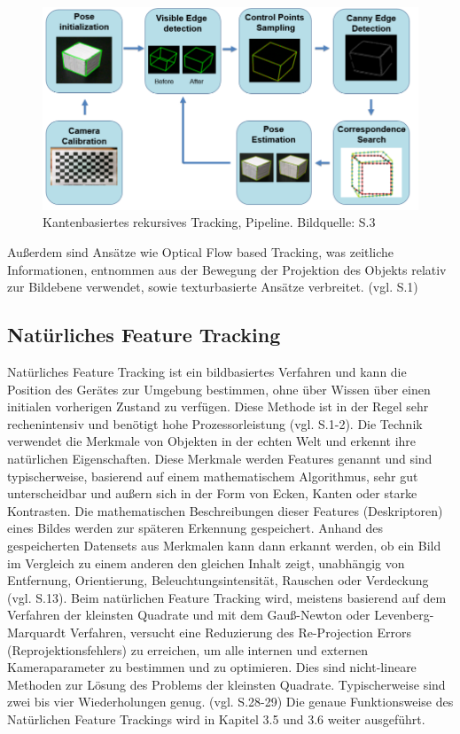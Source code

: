 \begin{figure}[H]
	\centering
	\includegraphics[scale=0.75]{wire.png}
	\caption{Kantenbasiertes rekursives Tracking, Pipeline. Bildquelle: \cite{model_based} S.3}
\end{figure} 

Außerdem sind Ansätze wie \glqq Optical Flow based Tracking\grqq{}, was zeitliche Informationen, entnommen aus der Bewegung der Projektion des Objekts relativ zur Bildebene verwendet, sowie texturbasierte Ansätze verbreitet. (vgl. \cite{model_based} S.1)

\subsection{Natürliches Feature Tracking}

Natürliches Feature Tracking ist ein bildbasiertes Verfahren und kann die Position des Gerätes zur Umgebung bestimmen, ohne über Wissen über einen initialen vorherigen Zustand zu verfügen. Diese Methode ist in der Regel sehr rechenintensiv und benötigt hohe Prozessorleistung (vgl. \cite{model_based} S.1-2). Die Technik verwendet die Merkmale von Objekten in der echten Welt und erkennt ihre natürlichen Eigenschaften. Diese Merkmale werden \glqq Features\grqq{} genannt und sind typischerweise, basierend auf einem mathematischem Algorithmus, sehr gut unterscheidbar und außern sich in der Form von Ecken, Kanten oder starke Kontrasten. Die mathematischen Beschreibungen dieser Features (Deskriptoren) eines Bildes werden zur späteren Erkennung gespeichert. Anhand des gespeicherten Datensets aus Merkmalen kann dann erkannt werden, ob ein Bild im Vergleich zu einem anderen den gleichen Inhalt zeigt, unabhängig von Entfernung, Orientierung, Beleuchtungsintensität, Rauschen oder Verdeckung (vgl. \cite{comparative_sdks} S.13). Beim natürlichen Feature Tracking wird, meistens basierend auf dem Verfahren der kleinsten Quadrate und mit dem Gauß-Newton oder Levenberg-Marquardt Verfahren, versucht eine Reduzierung des \glqq Re-Projection Errors\grqq{} (Reprojektionsfehlers) zu erreichen, um alle internen und externen Kameraparameter zu bestimmen und zu optimieren. Dies sind nicht-lineare Methoden zur Lösung des Problems der kleinsten Quadrate. Typischerweise sind zwei bis vier Wiederholungen genug. (vgl. \cite{natural_feature} S.28-29) Die genaue Funktionsweise des Natürlichen Feature Trackings wird in Kapitel 3.5 und 3.6 weiter ausgeführt.
 


